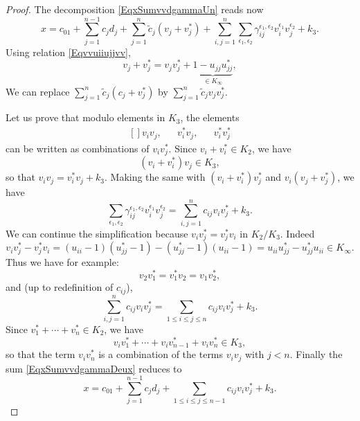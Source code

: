\begin{proof}
	The decomposition \eqref{EqxSumvvdgammaUn} reads now
	\begin{equation}        \label{EqxSumvvdgammaDeux}
		x=c_01+\sum_{j=1}^{n-1}c_jd_j+\sum_{j=1}^n\tilde c_j(v_j+v_j^*)+\sum_{i,j=1}^n\sum_{\epsilon_1,\epsilon_2}\gamma_{ij}^{\epsilon_1,\epsilon_2}v_i^{\epsilon_1}v_j^{\epsilon_2}+k_3.
	\end{equation}
	Using relation \eqref{Eqvvuiiujjvv},
	\begin{equation}
		v_j+v_j^*=v_jv_j^*+\underbrace{1-u_{jj}u_{jj}^*}_{\in K_{\infty}},
	\end{equation}
	We can replace $\sum_{j=1}^n\tilde c_j(c_j+v_j^*)$ by $\sum_{j=1}^n\tilde c_jv_jv_j^*$.

	Let us prove that modulo elements in $K_3$, the elements
	\begin{equation}
		\begin{aligned}[]
			v_iv_j, &  & v_i^*v_j, &  & v_i^*v_j^*
		\end{aligned}
	\end{equation}
	can be written as combinations of $v_iv_j^*$. Since $v_i+v_i^*\in K_2$, we have
	\begin{equation}
		(v_i+v_i^*)v_j\in K_3,
	\end{equation}
	so that $v_iv_j=v_i^*v_j+k_3$. Making the same with $(v_i+v_i^*)v_j^*$ and $v_i(v_j+v_j^*)$, we have
	\begin{equation}
		\sum_{\epsilon_1,\epsilon_2}\gamma_{ij}^{\epsilon_1,\epsilon_2}v_i^{\epsilon_1}v_j^{\epsilon_2}=\sum_{i,j=1}^nc_{ij}v_iv_j^*+k_3.
	\end{equation}
	We can continue the simplification because $v_iv_j^*=v_j^*v_i$ in $K_2/K_3$. Indeed
	\begin{equation}
		v_iv_j^*-v_j^*v_i=(u_{ii}-1)(u_{jj}^*-1)-(u_{jj}^*-1)(u_{ii}-1)=u_{ii}u_{jj}^*-u_{jj}^*u_{ii}\in K_{\infty}.
	\end{equation}
	Thus we have for example:
	\begin{equation}
		v_2v_1^*=v_1^*v_2=v_1v_2^*,
	\end{equation}
	and (up to redefinition of $c_{ij}$),
	\begin{equation}
		\sum_{i,j=1}^nc_{ij}v_iv_j^*=\sum_{1\leq i\leq j\leq n}c_{ij}v_iv_j^*+k_3.
	\end{equation}
	Since $v^*_1+\cdots+v^*_n\in K_2$, we have
	\begin{equation}
		v_iv_1^*+\cdots+v_iv^*_{n-1}+v_iv^*_n\in K_3,
	\end{equation}
	so that the term $v_iv^*_n$ is a combination of the terms $v_iv_j$ with $j<n$. Finally the sum \eqref{EqxSumvvdgammaDeux} reduces to
	\begin{equation}
		x=c_01+\sum_{j=1}^{n-1}c_jd_j+\sum_{1\leq i\leq j\leq n-1}c_{ij}v_iv_j^*+k_3.
	\end{equation}
\end{proof}



